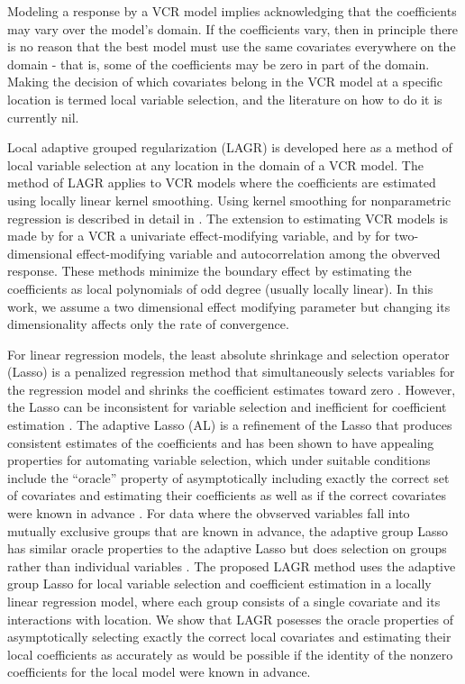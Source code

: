 \documentclass[authoryear,review, 12pt]{elsarticle}
\begin{document}
Modeling a response by a VCR model implies acknowledging that the
coefficients may vary over the model's domain. If the coefficients
vary, then in principle there is no reason that the best model must
use the same covariates everywhere on the domain - that is, some of
the coefficients may be zero in part of the domain. Making the decision
of which covariates belong in the VCR model at a specific location
is termed local variable selection, and the literature on how to do
it is currently nil.

Local adaptive grouped regularization (LAGR) is developed here as
a method of local variable selection at any location in the domain
of a VCR model. The method of LAGR applies to VCR models where the
coefficients are estimated using locally linear kernel smoothing.
Using kernel smoothing for nonparametric regression is described in
detail in \citet*{Fan-Gijbels-1996}. The extension to estimating
VCR models is made by \citet{Fan-Zhang-1999} for a VCR a univariate
effect-modifying variable, and by \citet{Sun-Yan-Zhang-Lu-2014} for
two-dimensional effect-modifying variable and autocorrelation among
the obverved response. These methods minimize the boundary effect
\citep{Hastie:1993b} by estimating the coefficients as local polynomials
of odd degree (usually locally linear). In this work, we assume a
two dimensional effect modifying parameter but changing its dimensionality
affects only the rate of convergence.

For linear regression models, the least absolute shrinkage and selection
operator (Lasso) is a penalized regression method that simultaneously
selects variables for the regression model and shrinks the coefficient
estimates toward zero \citep{Tibshirani-1996}. However, the Lasso
can be inconsistent for variable selection and inefficient for coefficient
estimation \citep{Zou-2006}. The adaptive Lasso (AL) is a refinement
of the Lasso that produces consistent estimates of the coefficients
and has been shown to have appealing properties for automating variable
selection, which under suitable conditions include the ``oracle''
property of asymptotically including exactly the correct set of covariates
and estimating their coefficients as well as if the correct covariates
were known in advance \citep{Zou-2006}. For data where the obvserved
variables fall into mutually exclusive groups that are known in advance,
the adaptive group Lasso has similar oracle properties to the adaptive
Lasso but does selection on groups rather than individual variables
\citep{Yuan-Lin-2006,Wang-Leng-2008}. The proposed LAGR method uses
the adaptive group Lasso for local variable selection and coefficient
estimation in a locally linear regression model, where each group
consists of a single covariate and its interactions with location.
We show that LAGR posesses the oracle properties of asymptotically
selecting exactly the correct local covariates and estimating their
local coefficients as accurately as would be possible if the identity
of the nonzero coefficients for the local model were known in advance.
\end{document}
